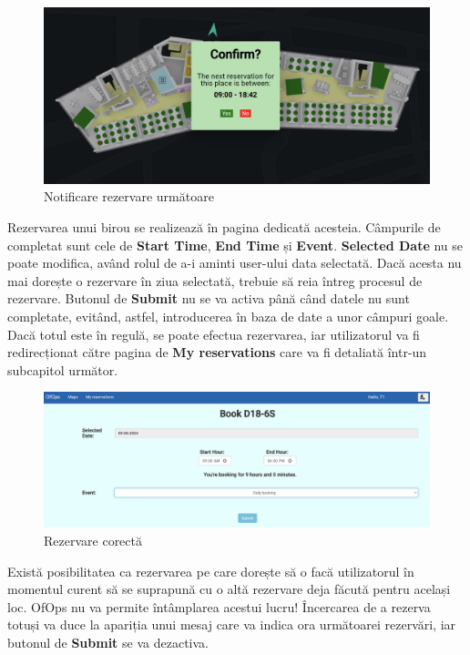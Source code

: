 \begin{figure}[!htb]
    \centering
    \includegraphics[width=0.9\linewidth]{images/notif.png}
    \caption{Notificare rezervare următoare}
    \label{fig:notif }
\end{figure}

Rezervarea unui birou se realizează în pagina dedicată acesteia. Câmpurile de completat sunt cele de \textbf{Start Time}, \textbf{End Time} și \textbf{Event}. \textbf{Selected Date} nu se poate modifica, având rolul de a-i aminti user-ului data selectată. Dacă acesta nu mai dorește o rezervare în ziua selectată, trebuie să reia întreg procesul de rezervare. Butonul de \textbf{Submit} nu se va activa până când datele nu sunt completate, evitând, astfel, introducerea în baza de date a unor câmpuri goale. Dacă totul este în regulă, se poate efectua rezervarea, iar utilizatorul va fi redirecționat către pagina de \textbf{My reservations} care va fi detaliată într-un subcapitol următor.

\begin{figure}[!htb]
    \centering
    \includegraphics[width=0.9\linewidth]{images/rezerv corecta.png}
    \caption{Rezervare corectă}
    \label{fig:rezerv corecta }
\end{figure}

Există posibilitatea ca rezervarea pe care dorește să o facă utilizatorul în momentul curent să se suprapună cu o altă rezervare deja făcută pentru același loc. OfOps nu va permite întâmplarea acestui lucru! Încercarea de a rezerva totuși va duce la apariția unui mesaj care va indica ora următoarei rezervări, iar butonul de \textbf{Submit} se va dezactiva.

